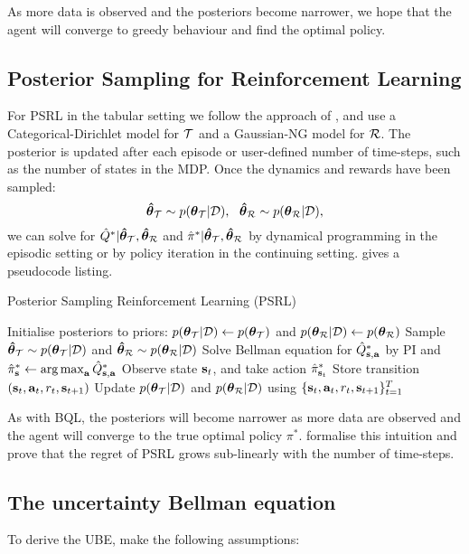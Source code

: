\documentclass{article}
\begin{document}
\begin{appendices}
As more data is observed and the posteriors become narrower, we hope that the agent will converge to greedy behaviour and find the optimal policy.

\subsection{Posterior Sampling for Reinforcement Learning} \label{app:psrl}

For PSRL in the tabular setting we follow the approach of \cite{psrl}, and use a Categorical-Dirichlet model for $\mathcal{T}$ and a Gaussian-NG model for $\mathcal{R}$. The posterior is updated after each episode or user-defined number of time-steps, such as the number of states in the MDP. Once the dynamics and rewards have been sampled:
$$\boldsymbol{\hat{\theta}}_{\mathcal{T}} \sim p(\boldsymbol{\theta}_{\mathcal{T}} | \mathcal{D}),~~ \boldsymbol{\hat{\theta}}_{\mathcal{R}} \sim p(\boldsymbol{\theta}_{\mathcal{R}} | \mathcal{D}),$$
we can solve for $\hat{Q}^* | \boldsymbol{\hat{\theta}}_{\mathcal{T}}, \boldsymbol{\hat{\theta}}_{\mathcal{R}} $ and $\hat{\pi}^* | \boldsymbol{\hat{\theta}}_{\mathcal{T}}, \boldsymbol{\hat{\theta}}_{\mathcal{R}}$ by dynamical programming in the episodic setting or by policy iteration in the continuing setting.  gives a pseudocode listing.

\begin{algorithm}
  \caption{Posterior Sampling Reinforcement Learning (PSRL)}\label{alg:psrl}
  \begin{algorithmic}[1]
\State Initialise posteriors to priors: $p(\boldsymbol{\theta}_{\mathcal{T}} | \mathcal{D}) \leftarrow p(\boldsymbol{\theta}_{\mathcal{T}})$ and $p(\boldsymbol{\theta}_{\mathcal{R}} | \mathcal{D}) \leftarrow p(\boldsymbol{\theta}_{\mathcal{R}})$
	\State Sample $\boldsymbol{\hat{\theta}}_{\mathcal{T}} \sim p(\boldsymbol{\theta}_{\mathcal{T}} | \mathcal{D})$ and $\boldsymbol{\hat{\theta}}_{\mathcal{R}} \sim p(\boldsymbol{\theta}_{\mathcal{R}} | \mathcal{D})$
	\State Solve Bellman equation for $\hat{Q}^*_{\mathbf{s}, \mathbf{a}}$ by PI and $\hat{\pi}^*_{\mathbf{s}} \leftarrow \operatorname*{arg\,max}_{\mathbf{a}} \hat{Q}^*_{\mathbf{s}, \mathbf{a}}$
	 	\State Observe state $\mathbf{s}_t$, and take action $\hat{\pi}^*_{\mathbf{s}_t}$
		\State Store transition $(\mathbf{s}_t, \mathbf{a}_t, r_t, \mathbf{s}_{t+1})$
	  \EndFor
	\State Update $p(\boldsymbol{\theta}_{\mathcal{T}} | \mathcal{D})$ and $p(\boldsymbol{\theta}_{\mathcal{R}} | \mathcal{D})$ using $\{\mathbf{s}_t, \mathbf{a}_t, r_t, \mathbf{s}_{t+1}\}_{t=1}^T$
 \EndFor
\end{algorithmic}
\end{algorithm}

As with BQL, the posteriors will become narrower as more data are observed and the agent will converge to the true optimal policy $\pi^*$. \cite{psrl} formalise this intuition and prove that the regret of PSRL grows sub-linearly with the number of time-steps.

\subsection{The uncertainty Bellman equation}\label{app:ube}
To derive the UBE, \cite{ube} make the following assumptions:


\end{appendices}
\end{document}
